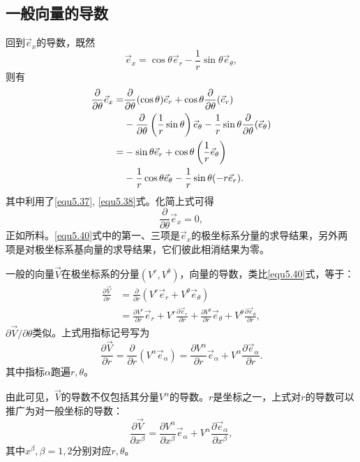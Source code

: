 \subsection*{一般向量的导数}
回到$\vec{e}_x$的导数，既然
\begin{equation}
    \vec{e}_x = \cos \theta \vec{e}_r - \frac{1}{r} \sin \theta \vec{e}_\theta, 
\label{equ5.39}
\end{equation}
则有
\begin{align}
    \frac{\partial}{\partial \theta} \vec{e}_x =& \frac{\partial}{\partial \theta} (\cos \theta) \vec{e}_r + \cos \theta \frac{\partial}{\partial \theta} (\vec{e}_r) \notag \\
    & -\frac{\partial}{\partial \theta} \left( \frac{1}{r} \sin \theta \right) \vec{e}_\theta - \frac{1}{r} \sin \theta \frac{\partial}{\partial \theta} (\vec{e}_\theta) \label{equ5.40} \\
    =& -\sin \theta \vec{e}_r + \cos \theta \left( \frac{1}{r} \vec{e}_\theta \right) \notag \\
    & - \frac{1}{r} \cos \theta \vec{e}_\theta - \frac{1}{r} \sin \theta (-r \vec{e}_r). \label{equ5.41}
\end{align}
其中利用了\eqref{equ5.37}, \eqref{equ5.38}式。化简上式可得
\begin{equation}
    \frac{\partial}{\partial \theta} \vec{e}_x = 0,
\label{equ5.42}
\end{equation}
正如所料。\eqref{equ5.40}式中的第一、三项是$\vec{e}_x$的极坐标系分量的求导结果，另外两项是对极坐标系基向量的求导结果，它们彼此相消结果为零。

一般的向量$\vec{V}$在极坐标系的分量$(V^r, V^\theta)$，向量的导数，类比\eqref{equ5.40}式，等于：
\begin{align*}
    \frac{\partial \vec{V}}{\partial r} &= \frac{\partial}{\partial r} (V^r \vec{e}_r + V^\theta \vec{e}_\theta) \\
    &= \frac{\partial V^r}{\partial r} \vec{e}_r + V^r \frac{\partial \vec{e}_r}{\partial r} + \frac{\partial V^\theta}{\partial r} \vec{e}_\theta + V^\theta \frac{\partial \vec{e}_\theta}{\partial r},
\end{align*}
$\partial \vec{V} / \partial \theta$类似。上式用指标记号写为
\[
    \frac{\partial \vec{V}}{\partial r} = \frac{\partial}{\partial r} (V^\alpha \vec{e}_\alpha) = \frac{\partial V^\alpha}{\partial r} \vec{e}_\alpha + V^\alpha \frac{\partial \vec{e}_\alpha}{\partial r}.
\]
其中指标$\alpha$跑遍$r, \theta$。

由此可见，$\vec{V}$的导数不仅包括其分量$V^\alpha$的导数。$r$是坐标之一，上式对$r$的导数可以推广为对一般坐标的导数：
\begin{equation}
    \frac{\partial \vec{V}}{\partial x^\beta} = \frac{\partial V^\alpha}{\partial x^\beta} \vec{e}_\alpha + V^\alpha \frac{\partial \vec{e}_\alpha}{\partial x^\beta},
\label{equ5.43}
\end{equation}
其中$x^\beta, \beta = 1, 2$分别对应$r, \theta$。

